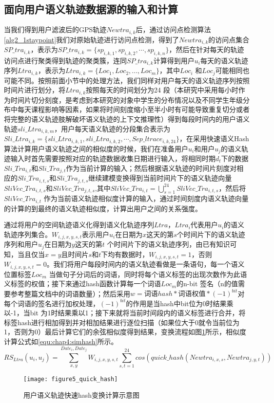 \subsection{面向用户语义轨迹数据源的输入和计算}
当我们得到用户滤波后的GPS轨迹$Newtra_{i,k}$后，通过访问点检测算法\ref{alg2_1staypoint}我们对原始轨迹进行访问点检测，得到了$Newtra_{i,k}$的访问点集合$SP\_tra_{i,k}$，表示为$SP\_tra_{i,k}=\{ sp_{i,k,1},sp_{i,k,2},\cdots , sp_{i,k,n} \}$，然后在针对每天的轨迹访问点进行聚类得到轨迹的聚类簇，连同$SP\_tra_{i,k}$计算得到用户$u_{i}$每天的语义轨迹序列$Ltra_{i,k}$，表示为$ Ltra_{i,k}=\{Loc_{1},Loc_{2},...,Loc_{m}\}$，其中$Loc_{i}$ 和$Loc_{j}$可能相同也可能不同。按照前面小节中的处理方法，我们同样对用户每天的语义轨迹序列按照时间片进行划分，将$ Ltra_{i,k}$按照每天的时间划分为24 段（本研究中采用每小时作为时间片切分刻度，是考虑到本研究的对象中学生的分布情况以及不同学生年级分布中每天课程影响等因素，如果将时间刻度缩小至半小时有可能导致重复切分或者将完整的语义轨迹肢解破坏语义轨迹的上下文推理性）得到每段时间内的用户语义轨迹$sli\_Ltra_{i,k,m}$，用户每天语义轨迹的分段集合表示为$Sli\_Ltra_{i,k}=\{sli\_Ltra_{i,k,1},sli\_Ltra_{i,k,2},\cdots,Sep\_ltrace_{i,k,24}\}$，在采用快速语义Hash算法计算用户语义轨迹之间的相似度的时候，我们在准备用户$u_{i}$和用户$u_{j}$的语义轨迹输入时首先需要按照对应的轨迹数据收集日期进行输入，将相同时期$d_{t}$下的数据$Sli\_Tra_{i,t}$和$Sli\_Tra_{j,t}$作为当前计算的输入；然后根据语义轨迹的时间片刻度对相应的$Sli\_Tra_{i,t,s}$和$Sli\_Tra_{j,t,s}$继续建模变换得到当前时间片下的语义轨迹向量$SliVec\_Tra_{i,t,s}$和$SliVec\_Tra_{j,t,s}$,其中$SliVec\_Tra_{i,t}=\bigcup_{s=1}^{24}SliVec\_Tra_{i,t,s}$，然后将$SliVec\_Tra_{i,t}$ 作为当前语义轨迹相似度计算的输入，通过时间刻度内语义轨迹向量的计算的到最终的语义轨迹相似度，计算出用户之间的关系强度。
\par 通过将用户的空间轨迹语义化得到语义化轨迹序列$Ltra$，$Ltra_{i}$代表用户$u_{i}$的语义轨迹序列集合。$W_{i,j,x,y,s,t}$表示用户$u_{i}$在日期为$x$这天的第$s$个时间片下的语义轨迹序列和用户$u_{j}$在日期为$y$这天的第$t$ 个时间片下的语义轨迹序列，由已有知识可知，当且仅当$x=y$且时间片$s$和$t$下均有数据时，$W_{i,j,x,y,s,t}=1$，否则$W_{i,j,x,y,s,t}=0$。我们将用户每段时间内的语义轨迹看做是一条语句，每一个语义位置标签$Loc_{m}$ 当做句子分词后的词语，同时将每个语义标签的出现次数作为此语义标签的权值；接下来通过hash函数计算每一个词语$Loc_{m}$的n-bit 签名（n的值需要参考整篇文档中的词语数量）；然后采用$w=\text{词语}hash*\text{词语权值}*(-1)^{bit}$对每个词语的签名进行加权处理，$(-1)^{bit}$的作用是当hash中bit位为0时结果乘以-1，当bit 为1时结果乘以1；接下来就将当前时间段内的语义标签进行合并，将标签hash进行相加得到并对相加结果进行逐位扫描（如果位大于0就令当前位为1，否则为0）最后计算它们的余弦相似度得到结果，变换流程如图\ref{fig:quick_hash}所示，相似度计算公式如\ref{equ:chap4:simhash}所示。
\begin{equation}
\label{equ:chap4:simhash}
RS_{Ltra}(u_{i},u_{j})=\sum_{x ,y }^{ Date_{i}, Date_{j}}W_{i,j,x,y,s,t}\sum_{s,t=1}^{24} cos(quick\_hash(Newtra_{i,x,s},Newtra_{j,y,t}))
\end{equation}
\begin{figure}[htb]
\centering
\texttt{[image: figure5\_quick\_hash]}
\caption{用户语义轨迹快速hash变换计算示意图}
\label{fig:quick_hash}
\end{figure}

